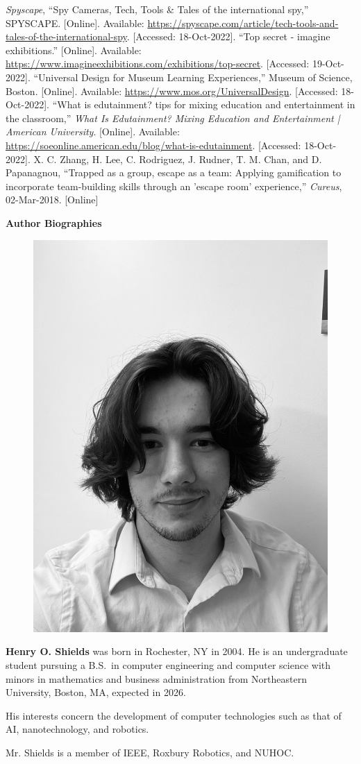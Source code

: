 \documentclass[conference]{IEEEtran}
\begin{document}
\begin{thebibliography}{00}
 \textit{Spyscape}, “Spy Cameras, Tech, Tools & Tales of the international spy,” SPYSCAPE. [Online]. Available: \href{https://spyscape.com/article/tech-tools-and-tales-of-the-international-spy}{https://spyscape.com/article/tech-tools-and-tales-of-the-international-spy}. [Accessed: 18-Oct-2022].
 “Top secret - imagine exhibitions.” [Online]. Available: \href{https://www.imagineexhibitions.com/exhibitions/top-secret}{https://www.imagineexhibitions.com/exhibitions/top-secret}. [Accessed: 19-Oct-2022].
 “Universal Design for Museum Learning Experiences,” Museum of Science, Boston.  [Online]. Available: \href{https://www.mos.org/UniversalDesign}{https://www.mos.org/UniversalDesign}. [Accessed: 18-Oct-2022].
 “What is edutainment? tips for mixing education and entertainment in the classroom,” \textit{What Is Edutainment? Mixing Education and Entertainment | American University}. [Online]. Available: \href{https://soeonline.american.edu/blog/what-is-edutainment}{https://soeonline.american.edu/blog/what-is-edutainment}. [Accessed: 18-Oct-2022]. 
 X. C. Zhang, H. Lee, C. Rodriguez, J. Rudner, T. M. Chan, and D. Papanagnou, “Trapped as a group, escape as a team: Applying gamification to incorporate team-building skills through an 'escape room' experience,” \textit{Cureus}, 02-Mar-2018. [Online]
\end{thebibliography}

\twocolumn


  \LARGE \textbf{Author Biographies}  

  \vspace{15pt} \normalsize


  \begin{figure}
    \includegraphics[width=.175\textwidth]{Figures/ShieldsImage.jpg}
  \end{figure}
  \par \textbf{Henry O. Shields} was born in Rochester, NY in 2004. He is an undergraduate student pursuing a B.S.\ in computer engineering and computer science with minors in mathematics and business administration from Northeastern University, Boston, MA, expected in 2026.
\par His interests concern the development of computer technologies such as that of AI, nanotechnology, and robotics.
\par Mr. Shields is a member of IEEE, Roxbury Robotics, and NUHOC.
\end{document}
